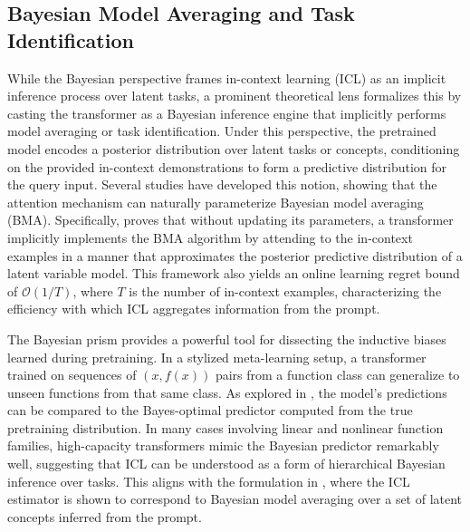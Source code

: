 \documentclass[11pt]{article}
\begin{document}
\subsection{Bayesian Model Averaging and Task Identification}

While the Bayesian perspective frames in-context learning (ICL) as an implicit inference process over latent tasks, a prominent theoretical lens formalizes this by casting the transformer as a Bayesian inference engine that implicitly performs model averaging or task identification. Under this perspective, the pretrained model encodes a posterior distribution over latent tasks or concepts, conditioning on the provided in-context demonstrations to form a predictive distribution for the query input. Several studies have developed this notion, showing that the attention mechanism can naturally parameterize Bayesian model averaging (BMA). Specifically, \cite{ref46} proves that without updating its parameters, a transformer implicitly implements the BMA algorithm by attending to the in-context examples in a manner that approximates the posterior predictive distribution of a latent variable model. This framework also yields an online learning regret bound of \(\mathcal{O}(1/T)\), where \(T\) is the number of in-context examples, characterizing the efficiency with which ICL aggregates information from the prompt.

The Bayesian prism provides a powerful tool for dissecting the inductive biases learned during pretraining. In a stylized meta-learning setup, a transformer trained on sequences of \((x, f(x))\) pairs from a function class can generalize to unseen functions from that same class. As explored in \cite{ref47}, the model's predictions can be compared to the Bayes-optimal predictor computed from the true pretraining distribution. In many cases involving linear and nonlinear function families, high-capacity transformers mimic the Bayesian predictor remarkably well, suggesting that ICL can be understood as a form of hierarchical Bayesian inference over tasks. This aligns with the formulation in \cite{ref46}, where the ICL estimator is shown to correspond to Bayesian model averaging over a set of latent concepts inferred from the prompt.
\end{document}
